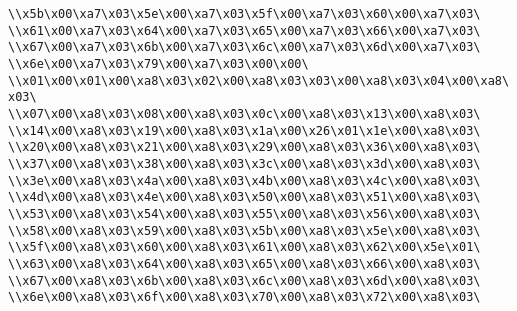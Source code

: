 \verb|\\x5b\x00\xa7\x03\x5e\x00\xa7\x03\x5f\x00\xa7\x03\x60\x00\xa7\x03\|\newline
\verb|\\x61\x00\xa7\x03\x64\x00\xa7\x03\x65\x00\xa7\x03\x66\x00\xa7\x03\|\newline
\verb|\\x67\x00\xa7\x03\x6b\x00\xa7\x03\x6c\x00\xa7\x03\x6d\x00\xa7\x03\|\newline
\verb|\\x6e\x00\xa7\x03\x79\x00\xa7\x03\x00\x00\|\newline
\verb|\\x01\x00\x01\x00\xa8\x03\x02\x00\xa8\x03\x03\x00\xa8\x03\x04\x00\xa8\x03\|\newline
\verb|\\x07\x00\xa8\x03\x08\x00\xa8\x03\x0c\x00\xa8\x03\x13\x00\xa8\x03\|\newline
\verb|\\x14\x00\xa8\x03\x19\x00\xa8\x03\x1a\x00\x26\x01\x1e\x00\xa8\x03\|\newline
\verb|\\x20\x00\xa8\x03\x21\x00\xa8\x03\x29\x00\xa8\x03\x36\x00\xa8\x03\|\newline
\verb|\\x37\x00\xa8\x03\x38\x00\xa8\x03\x3c\x00\xa8\x03\x3d\x00\xa8\x03\|\newline
\verb|\\x3e\x00\xa8\x03\x4a\x00\xa8\x03\x4b\x00\xa8\x03\x4c\x00\xa8\x03\|\newline
\verb|\\x4d\x00\xa8\x03\x4e\x00\xa8\x03\x50\x00\xa8\x03\x51\x00\xa8\x03\|\newline
\verb|\\x53\x00\xa8\x03\x54\x00\xa8\x03\x55\x00\xa8\x03\x56\x00\xa8\x03\|\newline
\verb|\\x58\x00\xa8\x03\x59\x00\xa8\x03\x5b\x00\xa8\x03\x5e\x00\xa8\x03\|\newline
\verb|\\x5f\x00\xa8\x03\x60\x00\xa8\x03\x61\x00\xa8\x03\x62\x00\x5e\x01\|\newline
\verb|\\x63\x00\xa8\x03\x64\x00\xa8\x03\x65\x00\xa8\x03\x66\x00\xa8\x03\|\newline
\verb|\\x67\x00\xa8\x03\x6b\x00\xa8\x03\x6c\x00\xa8\x03\x6d\x00\xa8\x03\|\newline
\verb|\\x6e\x00\xa8\x03\x6f\x00\xa8\x03\x70\x00\xa8\x03\x72\x00\xa8\x03\|\newline
